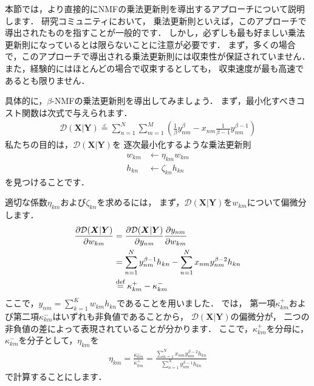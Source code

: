 本節では，より直接的にNMFの乗法更新則を導出するアプローチについて説明します．
研究コミュニティにおいて，
乗法更新則といえば，このアプローチで導出されたものを指すことが一般的です．
しかし，必ずしも最も好ましい乗法更新則になっているとは限らないことに注意が必要です．
まず，多くの場合で，このアプローチで導出される乗法更新則には収束性が保証されていません．
また，経験的にはほとんどの場合で収束するとしても，
収束速度が最も高速であるとも限りません．

具体的に，$\beta$-NMFの乗法更新則を導出してみましょう．
まず，最小化すべきコスト関数は次式で与えられます．
\begin{align}
\mathcal{D}(\bm{X}|\bm{Y}) 
\overset{c}{=}
\sum_{n=1}^N \sum_{m=1}^M 
\left(
\frac{1}{\beta} y_{nm}^\beta - x_{nm} \frac{1}{\beta - 1} y_{nm}^{\beta - 1}
\right)
\end{align}
私たちの目的は，$\mathcal{D}(\bm{X}|\bm{Y})$を
逐次最小化するような乗法更新則
\begin{align}
 w_{km} &\gets \eta_{km} w_{km}
 \\
 h_{kn} &\gets \zeta_{kn} h_{kn}
\end{align}
を見つけることです．

適切な係数$\eta_{km}$および$\zeta_{kn}$を求めるには，
まず，$\mathcal{D}(\bm{X}|\bm{Y})$を$w_{km}$について偏微分します．
\begin{align}
\frac{\partial \mathcal{D}(\bm{X}|\bm{Y})}{\partial w_{km}}
&=
\frac{\partial \mathcal{D}(\bm{X}|\bm{Y})}{\partial y_{nm}}
\frac{\partial y_{nm}}{\partial w_{km}}
\nonumber\\
&=
\sum_{n=1}^N y_{nm}^{\beta - 1} h_{kn}
-
\sum_{n=1}^N x_{nm} y_{nm}^{\beta - 2} h_{kn}
\nonumber\\
&\overset{\mbox{\scriptsize def}}{=} \kappa_{km}^+ - \kappa_{km}^-
\label{eqn:beta_nmf_pdiv}
\end{align}
ここで，$y_{nm} = \sum_{k=1}^K w_{km} h_{kn}$であることを用いました．
では，
第一項$\kappa_{km}^+$および第二項$\kappa^-_{km}$はいずれも非負値であることから，
$\mathcal{D}(\bm{X}|\bm{Y})$の偏微分が，
二つの非負値の差によって表現されていることが分かります．
ここで，$\kappa_{km}^+$を分母に，$\kappa_{km}^-$を分子として，$\eta_{km}$を
\begin{align}
\eta_{km} 
= \frac{\kappa_{km}^-}{\kappa_{km}^+} 
= \frac{\sum_{n=1}^N x_{nm} y_{nm}^{\beta - 2} h_{kn}}{\sum_{n=1}^N y_{nm}^{\beta - 1} h_{kn}}
\label{eqn:mu_eta_km}
\end{align}
で計算することにします．


